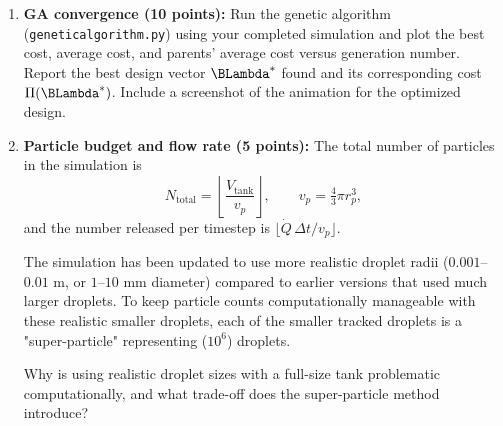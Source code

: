 \documentclass{article}
\begin{document}
\begin{enumerate}
\item[2. (c)] \textbf{GA convergence (10 points):}
Run the genetic algorithm (\texttt{geneticalgorithm.py}) using your completed simulation and plot the best cost,
average cost, and parents' average cost versus generation number.
Report the best design vector $\BLambda^*$ found and its corresponding cost $\Pi(\BLambda^*)$.
Include a screenshot of the animation for the optimized design.

\begin{answer}
\end{answer}



\item[3.] \textbf{Particle budget and flow rate (5 points):}
The total number of particles in the simulation is
\begin{equation}
    N_\text{total} = \left\lfloor \frac{V_\text{tank}}{v_p} \right\rfloor, \qquad v_p = \tfrac{4}{3}\pi r_p^3,
    \label{eq:ntotal}
\end{equation}
and the number released per timestep is $\lfloor \dot{Q}\,\Delta t / v_p \rfloor$.


The simulation has been updated to use more realistic droplet radii ($0.001$--$0.01$ m, or $1$--$10$ mm diameter) compared to earlier versions that used much larger droplets. To keep particle counts computationally manageable with these realistic smaller droplets, each of the smaller tracked droplets is a "super-particle" representing ($10^6$) droplets. 

Why is using realistic droplet sizes with a full-size tank problematic computationally, and what trade-off does the super-particle method introduce?

\begin{answer}
\end{answer}


\end{enumerate}
\end{document}
